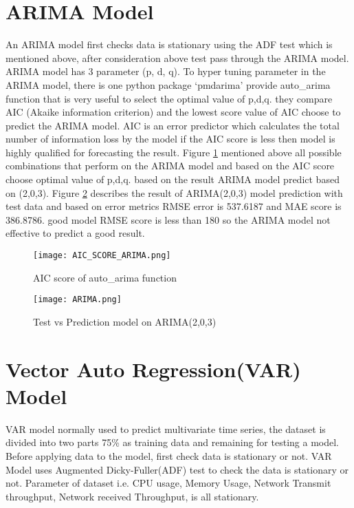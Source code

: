 \section{ARIMA Model}

An ARIMA model first checks data is stationary using the ADF test which is mentioned above, after consideration above test pass through the ARIMA model. ARIMA model has 3 parameter (p, d, q). To hyper tuning parameter in the ARIMA model, there is one python package ‘pmdarima’ provide auto\_arima function that is very useful to select the optimal value of p,d,q. they compare AIC (Akaike information criterion) and the lowest score value of AIC choose to predict the ARIMA model. AIC is an error predictor which calculates the total number of information loss by the model if the AIC score is less then model is highly qualified for forecasting the result. Figure \ref{fig:score} mentioned above all possible combinations that perform on the ARIMA model and based on the AIC score choose optimal value of p,d,q. based on the result ARIMA model predict based on (2,0,3). Figure \ref{fig:arima} describes the result of ARIMA(2,0,3) model prediction with test data and based on error metrics RMSE error is 537.6187 and MAE score is 386.8786. good model RMSE score is less than 180 so the ARIMA model not effective to predict a good result.
\begin{figure}
  \centering
    
      \texttt{[image: AIC\_SCORE\_ARIMA.png]}
  \caption{AIC score of auto\_arima function}
  \label{fig:score}
\end{figure}
\begin{figure}
  \centering
    
      \texttt{[image: ARIMA.png]}
  \caption{Test vs Prediction model on ARIMA(2,0,3)}
  \label{fig:arima}
\end{figure}

\section{ Vector Auto Regression(VAR) Model}
VAR model normally used to predict multivariate time series, the dataset is divided into two parts 75\% as training data and remaining for testing a model. Before applying data to the model, first check data is stationary or not. VAR Model uses Augmented Dicky-Fuller(ADF) test to check the data is stationary or not. Parameter of dataset i.e. CPU usage, Memory Usage, Network Transmit throughput, Network received Throughput, is all stationary.

